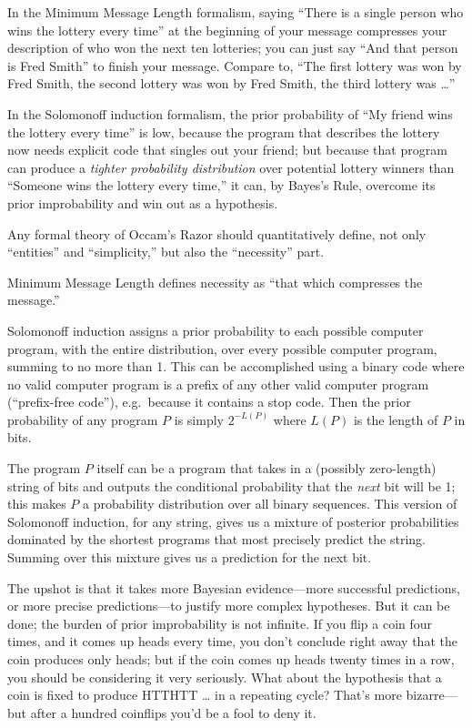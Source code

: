{
 In the Minimum Message Length formalism, saying
``There is a single person who wins the lottery every
time'' at the beginning of your message compresses
your description of who won the next ten lotteries; you can just say
``And that person is Fred Smith'' to
finish your message. Compare to, ``The first lottery
was won by Fred Smith, the second lottery was won by Fred Smith, the
third lottery was \ldots''}

{
 In the Solomonoff induction formalism, the prior probability of
``My friend wins the lottery every
time'' is low, because the program that describes the
lottery now needs explicit code that singles out your friend; but
because that program can produce a \textit{tighter probability
distribution} over potential lottery winners than
``Someone wins the lottery every
time,'' it can, by Bayes's Rule,
overcome its prior improbability and win out as a hypothesis.}

{
 Any formal theory of Occam's Razor should
quantitatively define, not only
``entities'' and
``simplicity,'' but also the
``necessity'' part.}

{
 Minimum Message Length defines necessity as
``that which compresses the
message.''}

{
 Solomonoff induction assigns a prior probability to each possible
computer program, with the entire distribution, over every possible
computer program, summing to no more than 1. This can be accomplished
using a binary code where no valid computer program is a prefix of any
other valid computer program (``prefix-free
code''), e.g.~because it contains a stop code. Then
the prior probability of any program $P$ is simply
$2^{-L(P)}$ where $L(P)$ is the length of $P$ in bits.}

{
 The program $P$ itself can be a program that takes in a (possibly
zero-length) string of bits and outputs the conditional probability
that the \textit{next} bit will be 1; this makes $P$ a probability
distribution over all binary sequences. This version of Solomonoff
induction, for any string, gives us a mixture of posterior
probabilities dominated by the shortest programs that most precisely
predict the string. Summing over this mixture gives us a prediction for
the next bit.}

{
 The upshot is that it takes more Bayesian evidence---more
successful predictions, or more precise predictions---to justify more
complex hypotheses. But it can be done; the burden of prior
improbability is not infinite. If you flip a coin four times, and it
comes up heads every time, you don't conclude right
away that the coin produces only heads; but if the coin comes up heads
twenty times in a row, you should be considering it very seriously.
What about the hypothesis that a coin is fixed to produce HTTHTT \ldots
in a repeating cycle? That's more bizarre---but after a
hundred coinflips you'd be a fool to deny it.}

